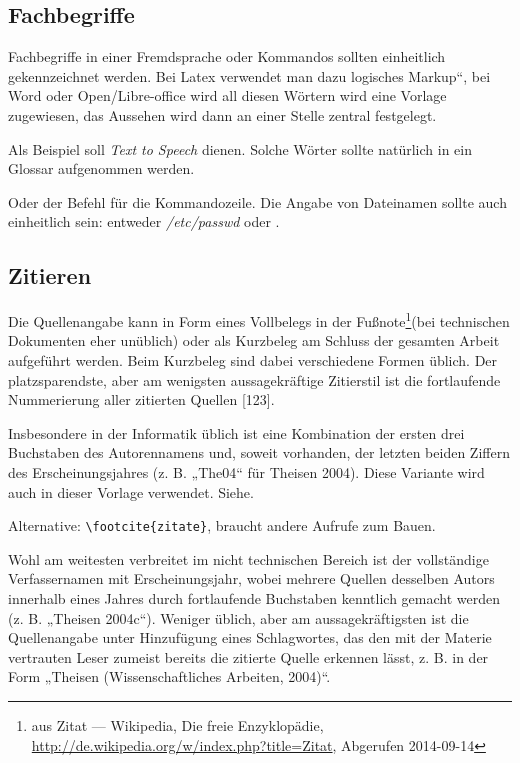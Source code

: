 \subsection{Fachbegriffe}

Fachbegriffe in einer Fremdsprache oder Kommandos sollten einheitlich
gekennzeichnet werden. Bei Latex verwendet man dazu \quotedblbase logisches
Markup``, bei Word oder Open/Libre-office wird all diesen Wörtern
wird eine Vorlage zugewiesen, das Aussehen wird dann an einer Stelle
zentral festgelegt.

Als Beispiel soll \emph{Text to Speech}
dienen. Solche Wörter sollte natürlich in ein Glossar aufgenommen
werden.

Oder der Befehl  für die Kommandozeile. Die Angabe von
Dateinamen sollte auch einheitlich sein: entweder \emph{/etc/passwd}
oder .


\subsection{Zitieren}

Die Quellenangabe kann in Form eines Vollbelegs in der Fußnote\footnote{aus Zitat --- Wikipedia, Die freie Enzyklopädie, \url{http://de.wikipedia.org/w/index.php?title=Zitat},
Abgerufen 2014-09-14}(bei technischen Dokumenten eher unüblich) oder als Kurzbeleg am Schluss
der gesamten Arbeit aufgeführt werden. Beim Kurzbeleg sind dabei verschiedene
Formen üblich. Der platzsparendste, aber am wenigsten aussagekräftige
Zitierstil ist die fortlaufende Nummerierung aller zitierten Quellen
{[}123{]}.


Insbesondere in der Informatik üblich ist eine Kombination der ersten drei Buchstaben
des Autorennamens und, soweit vorhanden, der letzten beiden Ziffern des Erscheinungsjahres
(z. B. „The04“ für Theisen 2004). Diese Variante wird auch in dieser Vorlage verwendet.
Siehe.

Alternative: \verb+\footcite{zitate}+, braucht andere Aufrufe zum Bauen.

Wohl am weitesten verbreitet im nicht technischen Bereich ist
der vollständige Verfassernamen mit Erscheinungsjahr, wobei mehrere
Quellen desselben Autors innerhalb eines Jahres durch fortlaufende
Buchstaben kenntlich gemacht werden (z. B. „Theisen 2004c“). Weniger
üblich, aber am aussagekräftigsten ist die Quellenangabe unter Hinzufügung
eines Schlagwortes, das den mit der Materie vertrauten Leser zumeist
bereits die zitierte Quelle erkennen lässt, z. B. in der Form „Theisen
(Wissenschaftliches Arbeiten, 2004)“.

